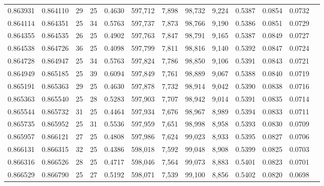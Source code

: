 \begin{tabular}{rrrrrrrrrrrrr}
0.863931 & 0.864110 &    29 &  25 &                                     0.4630 & 597,712 &   7,898 &  98,732 &   9,224 & 0.5387 & 0.0854 & 0.0732 \\
0.864114 & 0.864351 &    25 &  34 &                                     0.5763 & 597,737 &   7,873 &  98,766 &   9,190 & 0.5386 & 0.0851 & 0.0729 \\
0.864355 & 0.864535 &    26 &  25 &                                     0.4902 & 597,763 &   7,847 &  98,791 &   9,165 & 0.5387 & 0.0849 & 0.0727 \\
0.864538 & 0.864726 &    36 &  25 &                                     0.4098 & 597,799 &   7,811 &  98,816 &   9,140 & 0.5392 & 0.0847 & 0.0724 \\
0.864728 & 0.864947 &    25 &  34 &                                     0.5763 & 597,824 &   7,786 &  98,850 &   9,106 & 0.5391 & 0.0843 & 0.0721 \\
0.864949 & 0.865185 &    25 &  39 &                                     0.6094 & 597,849 &   7,761 &  98,889 &   9,067 & 0.5388 & 0.0840 & 0.0719 \\
0.865191 & 0.865363 &    29 &  25 &                                     0.4630 & 597,878 &   7,732 &  98,914 &   9,042 & 0.5390 & 0.0838 & 0.0716 \\
0.865363 & 0.865540 &    25 &  28 &                                     0.5283 & 597,903 &   7,707 &  98,942 &   9,014 & 0.5391 & 0.0835 & 0.0714 \\
0.865544 & 0.865732 &    31 &  25 &                                     0.4464 & 597,934 &   7,676 &  98,967 &   8,989 & 0.5394 & 0.0833 & 0.0711 \\
0.865735 & 0.865952 &    25 &  31 &                                     0.5536 & 597,959 &   7,651 &  98,998 &   8,958 & 0.5393 & 0.0830 & 0.0709 \\
0.865957 & 0.866121 &    27 &  25 &                                     0.4808 & 597,986 &   7,624 &  99,023 &   8,933 & 0.5395 & 0.0827 & 0.0706 \\
0.866131 & 0.866315 &    32 &  25 &                                     0.4386 & 598,018 &   7,592 &  99,048 &   8,908 & 0.5399 & 0.0825 & 0.0703 \\
0.866316 & 0.866526 &    28 &  25 &                                     0.4717 & 598,046 &   7,564 &  99,073 &   8,883 & 0.5401 & 0.0823 & 0.0701 \\
0.866529 & 0.866790 &    25 &  27 &                                     0.5192 & 598,071 &   7,539 &  99,100 &   8,856 & 0.5402 & 0.0820 & 0.0698 \\

\end{tabular}
